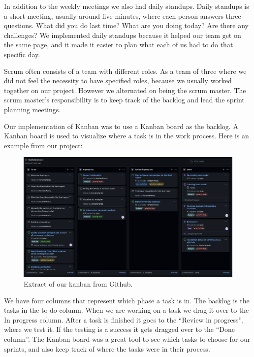 In addition to the weekly meetings we also had daily standups. Daily standups is a short meeting, usually around five minutes, where each person answers three questions. What did you do last time? What are you doing today? Are there any challenges? We implemented daily standups because it helped our team get on the same page, and it made it easier to plan what each of us had to do that specific day.

Scrum often consists of a team with different roles. As a team of three where we did not feel the necessity to have specified roles, because we usually worked together on our project. However we alternated on being the scrum master. The scrum master’s responsibility is to keep track of the backlog and lead the sprint planning meetings.

Our implementation of Kanban was to use a Kanban board as the backlog. A Kanban board is used to visualize where a task is in the work process. Here is an example from our project:

\begin{figure}[h!]
	\centering
	\includegraphics[width=1\linewidth]{figures/kanban_screenshot}
	\caption[kanban screenshot]{Extract of our kanban from Github.}
	\label{fig:kanbanscreenshot}
\end{figure}

We have four columns that represent which phase a task is in. The backlog is the tasks in the to-do column. When we are working on a task we drag it over to the In progress column. After a task is finished it goes to the “Review in progress”, where we test it. If the testing is a success it gets dragged over to the “Done column”. The Kanban board was a great tool to see which tasks to choose for our sprints, and also keep track of where the tasks were in their process.